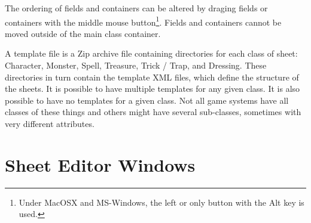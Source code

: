 The ordering of fields and containers can be altered by draging fields
or containers with the middle mouse button\footnote{Under MacOSX and
MS-Windows, the left or only button with the Alt key is used.}.  Fields
and containers cannot be moved outside of the main class container.

A template file is a Zip archive file containing directories for each
class of sheet: Character, Monster, Spell, Treasure, Trick / Trap, and
Dressing.  These directories in turn contain the template XML files,
which define the structure of the sheets.  It is possible to have
multiple templates for any given class.  It is also possible to have no
templates for a given class.  Not all game systems have all classes of
these things and others might have several sub-classes, sometimes with
very different attributes.

\section{Sheet Editor Windows}
\label{SheetEditor}

